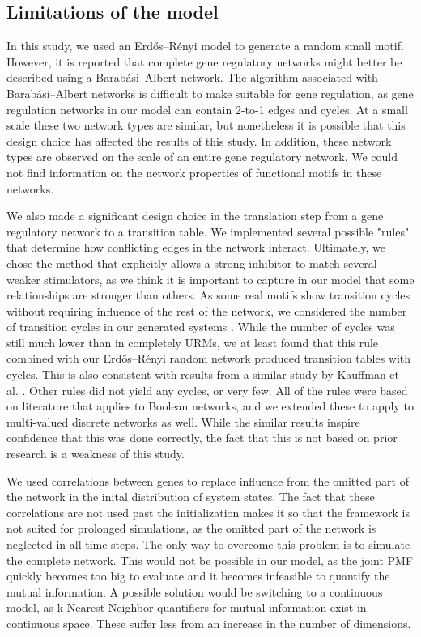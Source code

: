 \documentclass[../main.tex]{subfiles}
\begin{document}
\subsection{Limitations of the model}

In this study, we used an Erdős–Rényi model to generate a random small motif.
However, it is reported that complete gene regulatory networks might better be described using a Barabási–Albert network.
The algorithm associated with Barabási–Albert networks is difficult to make suitable for gene regulation, as gene regulation networks in our model can contain 2-to-1 edges and cycles.
At a small scale these two network types are similar, but nonetheless it is possible that this design choice has affected the results of this study.
In addition, these network types are observed on the scale of an entire gene regulatory network.
We could not find information on the network properties of functional motifs in these networks.

We also made a significant design choice in the translation step from a gene regulatory network to a transition table.
We implemented several possible "rules" that determine how conflicting edges in the network interact.
Ultimately, we chose the method that explicitly allows a strong inhibitor to match several weaker stimulators, as we think it is important to capture in our model that some relationships are stronger than others.
As some real motifs show transition cycles without requiring influence of the rest of the network, we considered the number of transition cycles in our generated systems \cite{burda2011motifs}.
While the number of cycles was still much lower than in completely URMs, we at least found that this rule combined with our Erdős–Rényi random network produced transition tables with cycles.
This is also consistent with results from a similar study by Kauffman et al. \cite{kauffman2003random}.
Other rules did not yield any cycles, or very few.
All of the rules were based on literature that applies to Boolean networks, and we extended these to apply to multi-valued discrete networks as well.
While the similar results inspire confidence that this was done correctly, the fact that this is not based on prior research is a weakness of this study.

We used correlations between genes to replace influence from the omitted part of the network in the inital distribution of system states.
The fact that these correlations are not used past the initialization makes it so that the framework is not suited for prolonged simulations, as the omitted part of the network is neglected in all time steps.
The only way to overcome this problem is to simulate the complete network.
This would not be possible in our model, as the joint PMF quickly becomes too big to evaluate and it becomes infeasible to quantify the mutual information.
A possible solution would be switching to a continuous model, as k-Nearest Neighbor quantifiers for mutual information exist in continuous space.
These suffer less from an increase in the number of dimensions.
\end{document}
